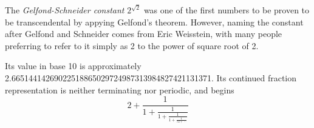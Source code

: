 \documentclass[12pt]{article}
\begin{document}
The {\em Gelfond-Schneider constant} $2^{\sqrt{2}}$ was one of the first numbers to be proven to be transcendental by appying Gelfond's theorem. However, naming the constant after Gelfond and Schneider comes from Eric Weisstein, with many people preferring to refer to it simply as 2 to the power of square root of 2.

Its value in base 10 is approximately 2.66514414269022518865029724987313984827421131371. Its continued fraction representation is neither terminating nor periodic, and begins $$2 + \frac{1}{1 + \frac{1}{1 + \frac{1}{1 + \frac{1}{72 + \, \cdots}}}}$$
\end{document}
